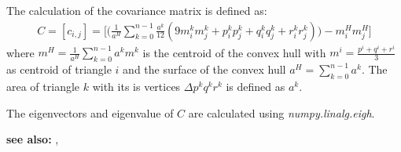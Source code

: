 \documentclass[letterpaper,10pt,english]{sphinxmanual}
\begin{document}
The calculation of the covariance matrix is defined as:
\begin{equation*}
\begin{split}C = [c_{i,j}] = \biggl[ \biggl (  \frac{1}{a^H}\sum\limits_{k=0}^{n-1}\frac{a^k}{12}(9m_i^km_j^k + p_i^kp_j^k + q_i^kq_j^k + r_i^kr_j^k) \biggr ) - m_i^Hm_j^H \biggr]\end{split}
\end{equation*}
where \(m^H = \frac {1}{a^H}\sum\limits_{k=0}^{n-1}a^km^k\) is the centroid of the convex hull with \(m^i = \frac{p^i+q^i+r^i}3\) as centroid of triangle \(i\) and the surface of the convex hull \(a^H = \sum\limits_{k=0}^{n-1}a^k\). The area of triangle \(k\) with its is vertices \(\Delta p^kq^kr^k\) is defined as \(a^k\).

The eigenvectors and eigenvalue of \(C\) are calculated using \emph{numpy.linalg.eigh}.

\textbf{see also:} {\hyperref[pk_src.alignObj:alignobj]{}}, {\hyperref[pk_src.exportData:exportdata]{}}
\end{document}
